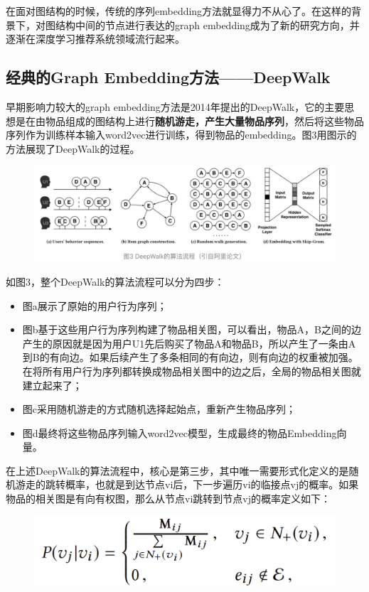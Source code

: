 \documentclass[12pt]{article}
\begin{document}
在面对图结构的时候，传统的序列embedding方法就显得力不从心了。在这样的背景下，对图结构中间的节点进行表达的graph embedding成为了新的研究方向，并逐渐在深度学习推荐系统领域流行起来。

\subsection{经典的Graph Embedding方法——DeepWalk}
早期影响力较大的graph embedding方法是2014年提出的DeepWalk，它的主要思想是在由物品组成的图结构上进行\textbf{随机游走，产生大量物品序列}，然后将这些物品序列作为训练样本输入word2vec进行训练，得到物品的embedding。图3用图示的方法展现了DeepWalk的过程。
\begin{figure}[H]
    \centering
    \includegraphics[width=.6\textwidth]{fig/Graph_Embedding_Deep_Walk_Example.png}
\end{figure}

如图3，整个DeepWalk的算法流程可以分为四步：
\begin{itemize}
\setlength{\itemsep}{0pt}
\setlength{\parsep}{0pt}
\setlength{\parskip}{0pt}
    \item 图a展示了原始的用户行为序列；
    \item 图b基于这些用户行为序列构建了物品相关图，可以看出，物品A，B之间的边产生的原因就是因为用户U1先后购买了物品A和物品B，所以产生了一条由A到B的有向边。如果后续产生了多条相同的有向边，则有向边的权重被加强。在将所有用户行为序列都转换成物品相关图中的边之后，全局的物品相关图就建立起来了；
    \item 图c采用随机游走的方式随机选择起始点，重新产生物品序列；
    \item 图d最终将这些物品序列输入word2vec模型，生成最终的物品Embedding向量。
\end{itemize}

在上述DeepWalk的算法流程中，核心是第三步，其中唯一需要形式化定义的是随机游走的跳转概率，也就是到达节点vi后，下一步遍历vi的临接点vj的概率。如果物品的相关图是有向有权图，那么从节点vi跳转到节点vj的概率定义如下：
\begin{figure}[H]
    \centering
    \includegraphics[width=.6\textwidth]{fig/Graph_Embedding_Deep_Walk_Trans_Prob.png}
\end{figure}
\end{document}
